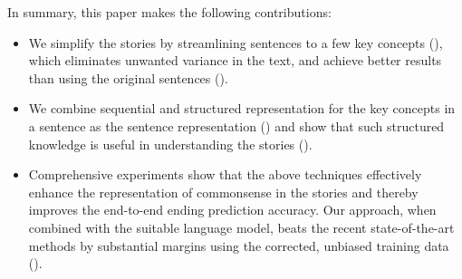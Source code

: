 In summary, this paper makes the following contributions:
\begin{itemize}
\item We simplify the stories by streamlining sentences to a few
key concepts (), 
which eliminates unwanted variance in the text,
and achieve better results than using the original sentences 
().
\item We combine sequential and structured representation for the key concepts
in a sentence as the sentence representation ()
and show that such structured
knowledge is useful in understanding the stories ().
\item Comprehensive experiments show that the above techniques effectively
enhance the representation of commonsense in the stories and thereby improves
the end-to-end ending prediction accuracy. Our approach, when combined with 
the suitable language model, beats the recent state-of-the-art methods by
substantial margins using the corrected, unbiased training data ().
\end{itemize}
